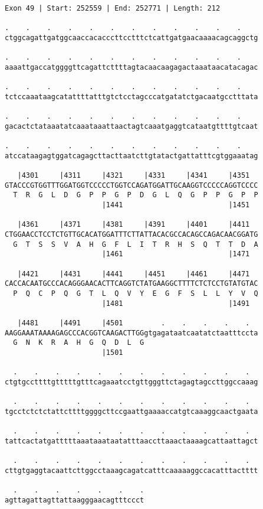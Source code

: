 \documentclass{article}
\begin{document}
\begin{Verbatim}
Exon 49 | Start: 252559 | End: 252771 | Length: 212
 
.    .    .    .    .    .    .    .    .    .    .    .    
ctggcagattgatggcaaccacacccttcctttctcattgatgaacaaaacagcaggctg
  
.    .    .    .    .    .    .    .    .    .    .    .    
aaaattgaccatggggttcagattcttttagtacaacaagagactaaataacatacagac
  
.    .    .    .    .    .    .    .    .    .    .    .    
tctccaaataagcatattttatttgtctcctagcccatgatatctgacaatgcctttata
  
.    .    .    .    .    .    .    .    .    .    .    .    
gacactctataaatatcaaataaattaactagtcaaatgaggtcataatgttttgtcaat
  
.    .    .    .    .    .    .    .    .    .    .    .    
atccataagagtggatcagagcttacttaatcttgtatactgattatttcgtggaaatag
  
   |4301     |4311     |4321     |4331     |4341     |4351  
GTACCCGTGGTTTGGATGGTCCCCCTGGTCCAGATGGATTGCAAGGTCCCCCAGGTCCCC
  T  R  G  L  D  G  P  P  G  P  D  G  L  Q  G  P  P  G  P  P
                       |1441                         |1451  
  
   |4361     |4371     |4381     |4391     |4401     |4411  
CTGGAACCTCCTCTGTTGCACATGGATTTCTTATTACACGCCACAGCCAGACAACGGATG
  G  T  S  S  V  A  H  G  F  L  I  T  R  H  S  Q  T  T  D  A
                       |1461                         |1471  
  
   |4421     |4431     |4441     |4451     |4461     |4471  
CACCACAATGCCCACAGGGAACACTTCAGGTCTATGAAGGCTTTTCTCTCCTGTATGTAC
  P  Q  C  P  Q  G  T  L  Q  V  Y  E  G  F  S  L  L  Y  V  Q
                       |1481                         |1491  
  
   |4481     |4491     |4501         .    .    .    .    .  
AAGGAAATAAAAGAGCCCACGGTCAAGACTTGGgtgagataatcaatatctaatttccta
  G  N  K  R  A  H  G  Q  D  L  G                           
                       |1501                                
  
  .    .    .    .    .    .    .    .    .    .    .    .  
ctgtgccttttgtttttgtttcagaaatcctgttgggttctagagtagccttggccaaag
  
  .    .    .    .    .    .    .    .    .    .    .    .  
tgcctctctctattcttttggggcttccgaattgaaaaccatgtcaaaggcaactgaata
  
  .    .    .    .    .    .    .    .    .    .    .    .  
tattcactatgatttttaaataaataatatttaaccttaaactaaaagcattaattagct
  
  .    .    .    .    .    .    .    .    .    .    .    .  
cttgtgaggtacaattcttggcctaaagcagatcatttcaaaaaggccacatttactttt
  
  .    .    .    .    .    .    .
agttagattagttattaagggaacagtttccct
\end{Verbatim}
\end{document}
